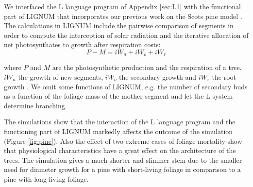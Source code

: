 We interfaced the L language program of Appendix \ref{sec:L1} with the
functional part of  LIGNUM that incorporates our previous  work on the
Scots pine model \citep{perttunen:96, perttunen:98}.  The calculations
in  LIGNUM include  the pairwise  comparison of  segments in  order to
compute  the  interception  of   solar  radiation  and  the  iterative
allocation of  net photosynthates  to growth after  respiration costs:
\begin{equation} P - M = iW_n + iW_o + iW_r \end{equation}

where  $P$   and  $M$  are  the  photosynthetic   production  and  the
respiration of a  tree, $iW_n$ the growth of  new segments, $iW_o$ the
secondary      growth     and      $iW_r$     the      root     growth
\citep[c.f.][]{perttunen:96,perttunen:01}.  We omit some  functions of
LIGNUM, e.g. the number of secondary buds as a function of the foliage
mass of the mother segment and let the L system determine branching.

The simulations  show that the  interaction of the L  language program
and the functioning part of LIGNUM markedly affects the outcome of the
simulation (Figure  \ref{fig:pine}).  Also  the effect of  two extreme
cases  of foliage  mortality show  that  physiological characteristics
have a great effect on  the architecture of the trees.  The simulation
gives a  much shorter  and slimmer  stem due to  the smaller  need for
diameter growth for a pine  with short-living foliage in comparison to
a pine with long-living foliage.

